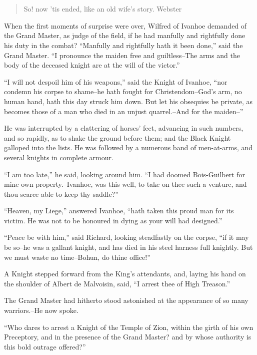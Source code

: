 \chapter{}

\begin{quote}
So! now 'tis ended, like an old wife's story.
Webster
\end{quote}

When the first moments of surprise were over, Wilfred of Ivanhoe
demanded of the Grand Master, as judge of the field, if he had manfully
and rightfully done his duty in the combat? ``Manfully and rightfully
hath it been done,'' said the Grand Master. ``I pronounce the maiden
free and guiltless--The arms and the body of the deceased knight are at
the will of the victor.''

``I will not despoil him of his weapons,'' said the Knight of Ivanhoe,
``nor condemn his corpse to shame--he hath fought for Christendom--God's
arm, no human hand, hath this day struck him down. But let his obsequies
be private, as becomes those of a man who died in an unjust
quarrel.--And for the maiden--''

He was interrupted by a clattering of horses' feet, advancing in such
numbers, and so rapidly, as to shake the ground before them; and the
Black Knight galloped into the lists. He was followed by a numerous band
of men-at-arms, and several knights in complete armour.

``I am too late,'' he said, looking around him. ``I had doomed
Bois-Guilbert for mine own property.--Ivanhoe, was this well, to take on
thee such a venture, and thou scarce able to keep thy saddle?''

``Heaven, my Liege,'' answered Ivanhoe, ``hath taken this proud man for
its victim. He was not to be honoured in dying as your will had
designed.''

``Peace be with him,'' said Richard, looking steadfastly on the corpse,
``if it may be so--he was a gallant knight, and has died in his steel
harness full knightly. But we must waste no time--Bohun, do thine
office!''

A Knight stepped forward from the King's attendants, and, laying his
hand on the shoulder of Albert de Malvoisin, said, ``I arrest thee of
High Treason.''

The Grand Master had hitherto stood astonished at the appearance of so
many warriors.--He now spoke.

``Who dares to arrest a Knight of the Temple of Zion, within the girth
of his own Preceptory, and in the presence of the Grand Master? and by
whose authority is this bold outrage offered?''

